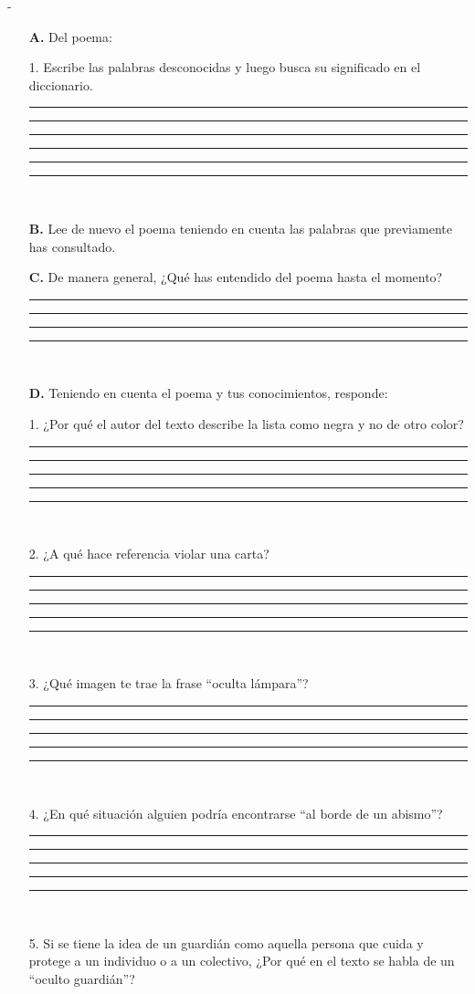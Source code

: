 \documentclass[11pt,fleqn,twocolumn]{book} %
\begin{document}
\begin{exercise}
-
\begin{itemize}
\item[\textbf{A.}] Del poema:
\item[1.] Escribe las palabras desconocidas y luego busca  su significado en el diccionario. \\
\rule[-0.2mm]{64mm}{0.1mm}
\rule[-0.2mm]{64mm}{0.1mm}
\rule[-0.2mm]{64mm}{0.1mm}
\rule[-0.2mm]{64mm}{0.1mm}
\rule[-0.2mm]{64mm}{0.1mm}
\rule[-0.2mm]{64mm}{0.1mm} \\
\item[\textbf{B.}] Lee de nuevo el poema teniendo en cuenta las palabras que previamente has consultado.\\
\item[\textbf{C.}] De manera general, ¿Qué has entendido del poema hasta el momento? \\
\rule[-0.2mm]{64mm}{0.1mm}
\rule[-0.2mm]{64mm}{0.1mm}
\rule[-0.2mm]{64mm}{0.1mm}
\rule[-0.2mm]{64mm}{0.1mm} \\
\item[\textbf{D.}] Teniendo en cuenta el poema y tus conocimientos, responde:
\item[1.] ¿Por qué el autor del texto describe la lista como negra y no de otro color?\\
\rule[-0.2mm]{64mm}{0.1mm}
\rule[-0.2mm]{64mm}{0.1mm}
\rule[-0.2mm]{64mm}{0.1mm}
\rule[-0.2mm]{64mm}{0.1mm}
\rule[-0.2mm]{64mm}{0.1mm} \\
\item[2.] ¿A qué hace referencia violar una carta?\\
\rule[-0.2mm]{64mm}{0.1mm}
\rule[-0.2mm]{64mm}{0.1mm}
\rule[-0.2mm]{64mm}{0.1mm}
\rule[-0.2mm]{64mm}{0.1mm}
\rule[-0.2mm]{64mm}{0.1mm} \\
\item[3.] ¿Qué imagen te trae la frase “oculta lámpara”? \\
\rule[-0.2mm]{64mm}{0.1mm}
\rule[-0.2mm]{64mm}{0.1mm}
\rule[-0.2mm]{64mm}{0.1mm}
\rule[-0.2mm]{64mm}{0.1mm}
\rule[-0.2mm]{64mm}{0.1mm} \\
\item[4.] ¿En qué situación alguien podría encontrarse “al borde de un abismo”?  \\
\rule[-0.2mm]{64mm}{0.1mm}
\rule[-0.2mm]{64mm}{0.1mm}
\rule[-0.2mm]{64mm}{0.1mm}
\rule[-0.2mm]{64mm}{0.1mm}
\rule[-0.2mm]{64mm}{0.1mm} \\
\item[5.] Si se tiene la idea de un guardián como aquella persona que cuida y protege a un individuo o a un colectivo, ¿Por qué en el texto se habla de un “oculto guardián”?  \\

\end{itemize}
\end{exercise}
\end{document}
